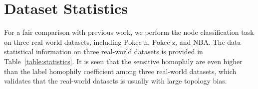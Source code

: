 \documentclass[letterpaper]{article} %
\theoremstyle{plain}
\theoremstyle{definition}
\theoremstyle{remark}
\begin{document}


\section{Dataset Statistics}\label{app:stat}
For a fair comparison with previous work, we perform the node classification task on three real-world datasets, including Pokec-n, Pokec-z, and NBA.
The data statistical information on three real-world datasets is provided in Table~\ref{table:statistics}. It is seen that the sensitive homophily are even higher than the label homophily coefficient among three real-world datasets, which validates that the real-world datasets is usually with large topology bias.

\begin{table}[h]
\fontsize{12}{12}\selectfont
\setlength{\tabcolsep}{3pt}
\begin{center}
\caption{Statistical Information on Datasets}
\label{table:statistics}
\end{center}
\end{table}

\end{document}
